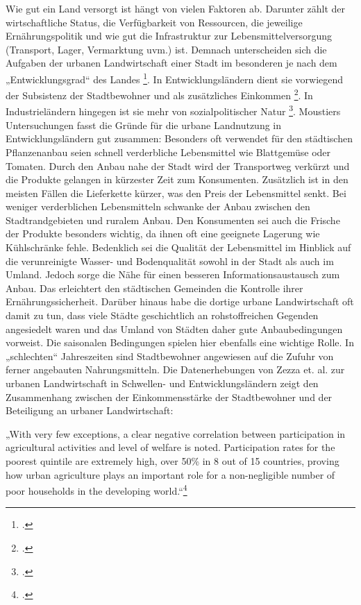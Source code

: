 \documentclass{scrartcl}
\begin{document}
Wie gut ein Land versorgt ist hängt von vielen Faktoren ab. Darunter zählt der wirtschaftliche Status, die Verfügbarkeit von Ressourcen, die jeweilige Ernährungspolitik und wie gut die Infrastruktur zur Lebensmittelversorgung (Transport, Lager, Vermarktung uvm.) ist. Demnach unterscheiden sich die Aufgaben der urbanen Landwirtschaft einer Stadt im besonderen je nach dem „Entwicklungsgrad“ des Landes \footcite{SmitUrbanToday}. In Entwicklungsländern dient sie vorwiegend der Subsistenz der Stadtbewohner und als zusätzliches Einkommen \footcites[vgl.][S.70]{Nugent2000TheEconomies}[S.26f]{SmitUrbanToday}. In Industrieländern hingegen ist sie mehr von sozialpolitischer Natur \footcites[vgl.][S. 21]{Berges2004UrbaneStadt}[S.26f]{SmitUrbanToday}. Moustiers Untersuchungen fasst die Gründe für die urbane Landnutzung in Entwicklungsländern gut zusammen: Besonders oft verwendet für den städtischen Pflanzenanbau seien schnell verderbliche Lebensmittel wie Blattgemüse oder Tomaten. Durch den Anbau nahe der Stadt wird der Transportweg verkürzt und die Produkte gelangen in kürzester Zeit zum Konsumenten. Zusätzlich ist in den meisten Fällen die Lieferkette kürzer, was den Preis der Lebensmittel senkt. Bei weniger verderblichen Lebensmitteln schwanke der Anbau zwischen den Stadtrandgebieten und ruralem Anbau. Den Konsumenten sei auch die Frische der Produkte besonders wichtig, da ihnen oft eine geeignete Lagerung wie Kühlschränke fehle. Bedenklich sei die Qualität der Lebensmittel im Hinblick auf die verunreinigte Wasser- und Bodenqualität sowohl in der Stadt als auch im Umland. Jedoch sorge die Nähe für einen besseren Informationsaustausch zum Anbau. Das erleichtert den städtischen Gemeinden die Kontrolle ihrer Ernährungssicherheit. Darüber hinaus habe die dortige urbane Landwirtschaft oft damit zu tun, dass viele Städte geschichtlich an rohstoffreichen Gegenden angesiedelt waren und das Umland von Städten daher gute Anbaubedingungen vorweist. Die saisonalen Bedingungen spielen hier ebenfalls eine wichtige Rolle. In „schlechten“ Jahreszeiten sind Stadtbewohner angewiesen auf die Zufuhr von ferner angebauten Nahrungsmitteln. Die Datenerhebungen von Zezza et. al. zur urbanen Landwirtschaft in Schwellen- und Entwicklungsländern zeigt den Zusammenhang zwischen der Einkommensstärke der Stadtbewohner und der Beteiligung an urbaner Landwirtschaft:
\begin{displayquote}
„With very few exceptions, a clear negative correlation between participation in agricultural activities and level of welfare is noted. Participation rates for the poorest quintile are extremely high, over 50\% in 8 out of 15 countries, proving how urban agriculture plays an important role for a non-negligible number of poor households in the developing world.“\footcite[S.268]{Zezza2010UrbanCountries}
\end{displayquote}
\end{document}
